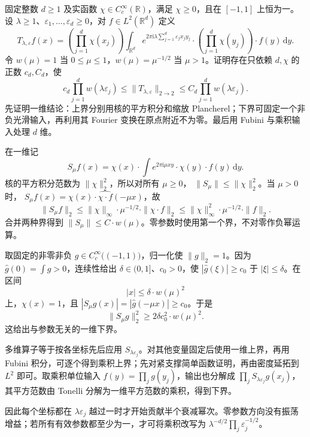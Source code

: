 \begin{exercise}\label{b2:ex:21-new-4}
固定整数 \(d\geq1\) 及实函数 \(\chi\in C_c^\infty(\mathbb R)\)，满足 \(\chi\geq0\)，且在 \([-1,1]\) 上恒为一。设 \(\lambda\geq1\)、\(\varepsilon_1,\ldots,\varepsilon_d\geq0\)，对 \(f\in L^2(\mathbb R^d)\) 定义
\[
 T_{\lambda,\varepsilon}f(x)
 =\left(\prod_{j=1}^d\chi(x_j)\right)
   \int_{\mathbb R^d}
     e^{2\pi\mathrm i\lambda\sum_{j=1}^d\varepsilon_jx_jy_j}
     \cdot\left(\prod_{j=1}^d\chi(y_j)\right)\cdot f(y)\,\mathrm dy.
\]
令 \(w(\mu)=1\) 当 \(0\leq\mu\leq1\)，\(w(\mu)=\mu^{-1/2}\) 当 \(\mu>1\)。证明存在只依赖 \(d,\chi\) 的正数 \(c_d,C_d\)，使
\[
 c_d\prod_{j=1}^dw(\lambda\varepsilon_j)
 \leq\|T_{\lambda,\varepsilon}\|_{2\to2}
 \leq C_d\prod_{j=1}^dw(\lambda\varepsilon_j).
\]
先证明一维结论：上界分别用核的平方积分和缩放 Plancherel；下界可固定一个非负光滑输入，再利用其 Fourier 变换在原点附近不为零。最后用 Fubini 与乘积输入处理 \(d\) 维。
\end{exercise}
\begin{solution}
在一维记
\[
 S_\mu f(x)=\chi(x)\cdot
       \int e^{2\pi\mathrm i\mu xy}\cdot\chi(y)\cdot f(y)\,\mathrm dy.
\]
核的平方积分范数为 \(\|\chi\|_2^2\)，所以对所有 \(\mu\geq0\)，
\(\|S_\mu\|\leq\|\chi\|_2^2\)。当 \(\mu>0\) 时，
\(S_\mu f(x)=\chi(x)\cdot\widehat{\chi\cdot f}(-\mu x)\)，故
\[
 \|S_\mu f\|_2
 \leq\|\chi\|_\infty\cdot\mu^{-1/2}\cdot\|\chi\cdot f\|_2
 \leq\|\chi\|_\infty^2\cdot\mu^{-1/2}\cdot\|f\|_2.
\]
合并两种界得到 \(\|S_\mu\|\leq C\cdot w(\mu)\)。零参数时使用第一个界，不对零作负幂运算。

取固定的非零非负 \(g\in C_c^\infty\bigl((-1,1)\bigr)\)，归一化使 \(\|g\|_2=1\)。因为 \(\widehat g(0)=\int g>0\)，连续性给出 \(\delta\in(0,1]\)、\(c_0>0\)，使 \(|\widehat g(\xi)|\geq c_0\) 于 \(|\xi|\leq\delta\)。在区间
\[
 |x|\leq\delta\cdot w(\mu)^2
\]
上，\(\chi(x)=1\)，且 \(|S_\mu g(x)|=|\widehat g(-\mu x)|\geq c_0\)。于是
\[
 \|S_\mu g\|_2^2
       \geq2\delta c_0^2\cdot w(\mu)^2.
\]
这给出与参数无关的一维下界。

多维算子等于按各坐标先后应用 \(S_{\lambda\varepsilon_j}\)。对其他变量固定后使用一维上界，再用 Fubini 积分，可逐个得到乘积上界；先对紧支撑简单函数证明，再由密度延拓到 \(L^2\) 即可。取乘积单位输入 \(f(y)=\prod_jg(y_j)\)，输出也分解成 \(\prod_jS_{\lambda\varepsilon_j}g(x_j)\)，其平方范数由 Tonelli 分解为一维平方范数的乘积，得到下界。

因此每个坐标都在 \(\lambda\varepsilon_j\) 越过一时才开始贡献半个衰减幂次。零参数方向没有振荡增益；若所有有效参数都至少为一，才可将乘积改写为 \(\lambda^{-d/2}\prod_j\varepsilon_j^{-1/2}\)。
\end{solution}

